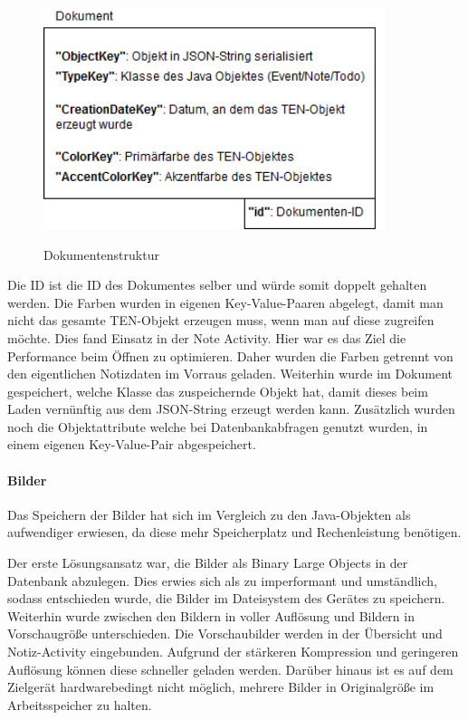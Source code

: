 \begin{figure}[H]
\centering
\begin{minipage}[t]{1\textwidth} %
\caption{Dokumentenstruktur} %
\includegraphics[width=10cm]{img/Dokumentenstruktur}\\ %
\end{minipage}
\end{figure}

Die ID ist die ID des Dokumentes selber und würde somit doppelt gehalten werden. Die Farben wurden in eigenen Key-Value-Paaren abgelegt, damit man nicht das gesamte TEN-Objekt erzeugen muss, wenn man auf diese zugreifen möchte. Dies fand Einsatz in der Note Activity. Hier war es das Ziel die Performance beim Öffnen zu optimieren. Daher wurden die Farben getrennt von den eigentlichen Notizdaten im Vorraus geladen. Weiterhin wurde im Dokument gespeichert, welche Klasse das zuspeichernde Objekt hat, damit dieses beim Laden vernünftig aus dem JSON-String erzeugt werden kann. Zusätzlich wurden noch die Objektattribute welche bei Datenbankabfragen genutzt wurden, in einem eigenen Key-Value-Pair abgespeichert.

\paragraph{Bilder}
Das Speichern der Bilder hat sich im Vergleich zu den Java-Objekten als aufwendiger erwiesen, da diese mehr Speicherplatz und Rechenleistung benötigen.

Der erste Lösungsansatz war, die Bilder als Binary Large Objects in der Datenbank abzulegen. Dies erwies sich als zu imperformant und umständlich, sodass entschieden wurde, die Bilder im Dateisystem des Gerätes zu speichern. Weiterhin wurde zwischen den Bildern in voller Auflösung und Bildern in Vorschaugröße unterschieden. Die Vorschaubilder werden in der Übersicht und Notiz-Activity eingebunden. Aufgrund der stärkeren Kompression und geringeren Auflösung können diese schneller geladen werden. Darüber hinaus ist es auf dem Zielgerät hardwarebedingt nicht möglich, mehrere Bilder in Originalgröße im Arbeitsspeicher zu halten.


